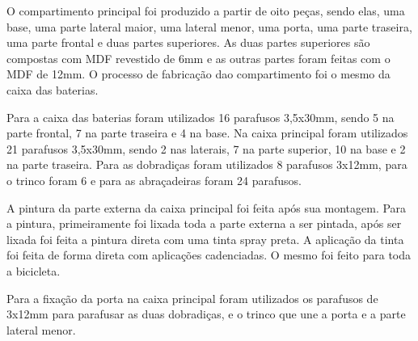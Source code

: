 	O compartimento principal foi produzido a partir de oito peças, sendo elas, uma base, uma parte lateral maior, uma lateral menor, uma porta, uma parte traseira, uma parte frontal e duas partes superiores. As duas partes superiores são compostas com MDF revestido de 6mm e as outras partes foram feitas com o MDF de 12mm. O processo de fabricação dao compartimento foi o mesmo da caixa das baterias.
	
	Para a caixa das baterias foram utilizados 16 parafusos 3,5x30mm, sendo 5 na parte frontal, 7 na parte traseira e 4 na base. Na caixa principal foram utilizados 21 parafusos 3,5x30mm, sendo 2 nas laterais, 7 na parte superior, 10 na base e 2 na parte traseira. Para as dobradiças foram utilizados 8 parafusos 3x12mm, para o trinco foram 6 e para as abraçadeiras foram 24 parafusos.
	
	A pintura da parte externa da caixa principal foi feita após sua montagem. Para a pintura, primeiramente foi lixada toda a parte externa a ser pintada, após ser lixada foi feita a pintura direta com uma tinta spray preta. A aplicação da tinta foi feita de forma direta com aplicações cadenciadas. O mesmo foi feito para toda a bicicleta.
	
	Para a fixação da porta na caixa principal foram utilizados os parafusos de 3x12mm para parafusar as duas dobradiças, e o trinco que une a porta e a parte lateral menor. 
	
